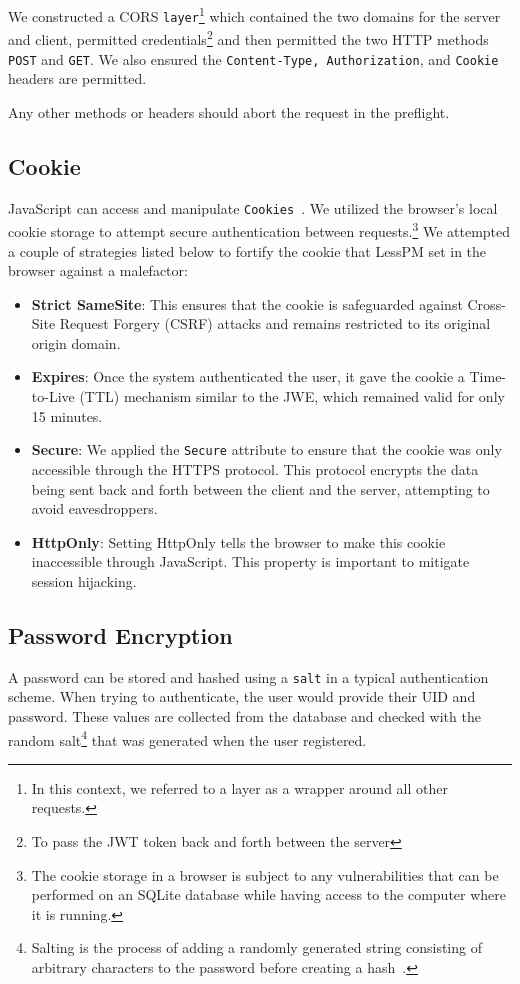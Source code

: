 We constructed a CORS \texttt{layer}\footnote{
  In this context, we referred to a layer as a wrapper around all other
  requests.
} which contained the two domains for the server and client, permitted
credentials\footnote{
  To pass the JWT token back and forth between the server
} and then permitted the two HTTP methods \texttt{POST} and \texttt{GET}.
We also ensured the \texttt{Content-Type, Authorization}, and \texttt{Cookie}
headers are permitted.

Any other methods or headers should abort the request in the preflight.

\subsection{Cookie}\label{subsec:cookie}
JavaScript can access and manipulate \texttt{Cookies}~\cite{he2019malicious}.
We utilized the browser's local cookie storage to attempt secure authentication
between requests.\footnote{
  The cookie storage in a browser is subject to any vulnerabilities that can be
  performed on an SQLite database while having access to the computer where it
  is running.
}
We attempted a couple of strategies listed below to fortify the cookie that
LessPM set in the browser against a malefactor:
\begin{itemize}
  \item \textbf{Strict SameSite}:
  This ensures that the cookie is safeguarded against Cross-Site Request Forgery
  (CSRF) attacks and remains restricted to its original origin domain.
  \item \textbf{Expires}:
  Once the system authenticated the user, it gave the cookie a Time-to-Live
  (TTL) mechanism similar to the JWE, which remained valid for only 15 minutes.
  \item \textbf{Secure}:
  We applied the \texttt{Secure} attribute to ensure that the cookie was only
  accessible through the HTTPS protocol.
  This protocol encrypts the data being sent back and forth between the client
  and the server, attempting to avoid eavesdroppers.
  \item \textbf{HttpOnly}:
  Setting HttpOnly tells the browser to make this cookie inaccessible through
  JavaScript.
  This property is important to mitigate session hijacking.
\end{itemize}

\subsection{Password Encryption}\label{subsec:password-encryption}
A password can be stored and hashed using a \texttt{salt} in a typical
authentication scheme.
When trying to authenticate, the user would provide their UID and password.
These values are collected from the database and checked with the random
salt\footnote{
  Salting is the process of adding a randomly generated string consisting of
  arbitrary characters to the password before creating a hash~\cite{Kharod2015}.
} that was generated when the user registered.


